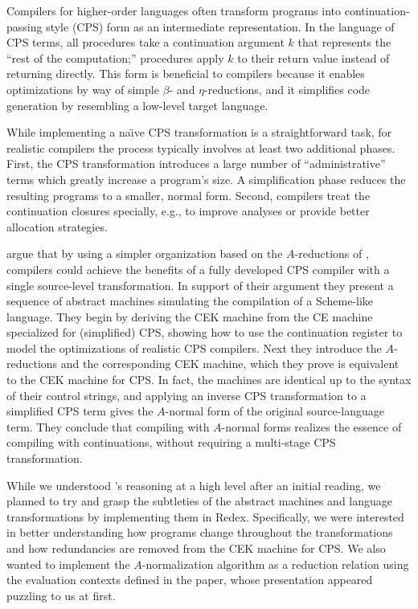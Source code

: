 \documentclass[11pt]{article}
\begin{document}
\thispagestyle{fancy}

Compilers for higher-order languages often transform programs into
continuation-passing style (CPS) form as an intermediate representation. In the
language of CPS terms, all procedures take a continuation argument $k$
that represents the ``rest of the computation;'' procedures apply $k$ to their
return value instead of returning directly. This form is beneficial to
compilers because it enables optimizations by way of simple $\beta$- and
$\eta$-reductions, and it simplifies code generation by resembling a low-level
target language.

While implementing a na\"{\i}ve CPS transformation is a straightforward task,
for realistic compilers the process typically involves at least two additional
phases. First, the CPS transformation introduces a large number of
``administrative'' terms which greatly increase a program's size.
A simplification phase reduces the resulting programs to a smaller, normal
form. Second, compilers treat the continuation closures specially, e.g., to
improve analyses or provide better allocation strategies.

\citet{Flanagan:1993fk} argue that by using a simpler organization based on
the $A$-reductions of \citet{Sabry:1992zr}, compilers could achieve the 
benefits of a fully developed CPS compiler with a single source-level
transformation. In support of their argument they present a sequence of
abstract machines simulating the compilation of a Scheme-like language.
They begin by deriving the CEK machine from the CE machine specialized for
(simplified) CPS, showing how to use the continuation register to model the
optimizations of realistic CPS compilers. Next they introduce the
$A$-reductions and the corresponding CEK machine, which they prove is
equivalent to the CEK machine for CPS. In fact, the machines are identical
up to the syntax of their control strings, and applying an inverse CPS
transformation to a simplified CPS term gives the $A$-normal form of the
original source-language term. They conclude that compiling with $A$-normal
forms realizes the essence of compiling with continuations, without requiring
a multi-stage CPS transformation.

While we understood \citeauthor{Flanagan:1993fk}'s reasoning at a high level
after an initial reading, we planned to try and grasp the subtleties of the
abstract machines and language transformations by implementing them in Redex.
Specifically, we were interested in better understanding how programs change
throughout the transformations and how redundancies are removed from the
CEK machine for CPS. We also wanted to implement the $A$-normalization
algorithm as a reduction relation using the evaluation contexts defined in the
paper, whose presentation appeared puzzling to us at first.
\end{document}
